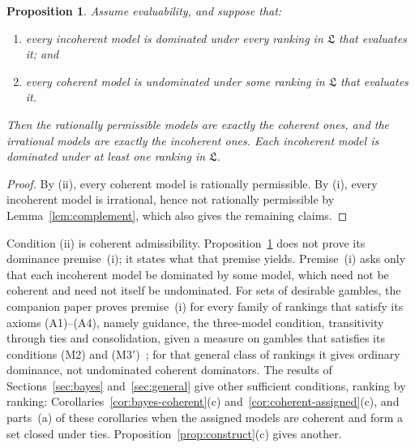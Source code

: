\documentclass[11pt]{article}
\newtheorem{proposition}[theorem]{Proposition}
\theoremstyle{definition}
\theoremstyle{remark}
\newcommand{\Lf}{\mathfrak L}
\begin{document}
\begin{proposition}\label{prop:family}
Assume evaluability, and suppose that:
\begin{enumerate}[label=(\roman*)]
\item every incoherent model is dominated under every ranking in $\Lf$ that evaluates it; and
\item every coherent model is undominated under some ranking in $\Lf$ that evaluates it.
\end{enumerate}
Then the rationally permissible models are exactly the coherent ones, and the irrational models are exactly the incoherent ones. Each incoherent model is dominated under at least one ranking in $\Lf$.
\end{proposition}
\begin{proof}
By (ii), every coherent model is rationally permissible. By (i), every incoherent model is irrational, hence not rationally permissible by Lemma~\ref{lem:complement}, which also gives the remaining claims.
\end{proof}

Condition (ii) is coherent admissibility. Proposition~\ref{prop:family} does not prove its dominance premise~(i); it states what that premise yields. Premise~(i) asks only that each incoherent model be dominated by some model, which need not be coherent and need not itself be undominated. For sets of desirable gambles, the companion paper proves premise~(i) for every family of rankings that satisfy its axioms (A1)--(A4), namely guidance, the three-model condition, transitivity through ties and consolidation, given a measure on gambles that satisfies its conditions (M2) and (M3$'$)~\cite[Theorem~4.1]{KCM}; for that general class of rankings it gives ordinary dominance, not undominated coherent dominators. The results of Sections~\ref{sec:bayes} and~\ref{sec:general} give other sufficient conditions, ranking by ranking: Corollaries~\ref{cor:bayes-coherent}(c) and~\ref{cor:coherent-assigned}(c), and parts~(a) of these corollaries when the assigned models are coherent and form a set closed under ties. Proposition~\ref{prop:construct}(c) gives another.
\end{document}
